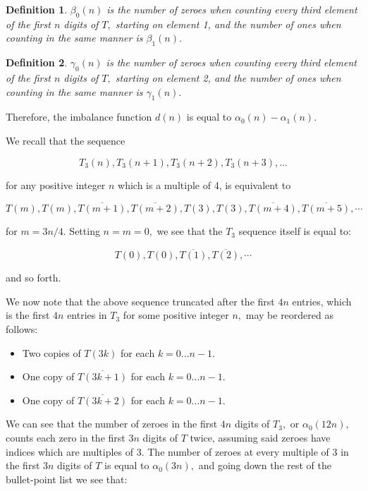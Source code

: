 \documentclass{article}
\newtheorem{definition}{Definition}[section]
\begin{document}
\begin{definition}
$\beta_0(n)$ is the number of zeroes when counting every third element of the first $n$ digits of $T,$ starting on element 1, and the number of ones when counting in the same manner is $\beta_1(n).$
\end{definition}

\begin{definition}
$\gamma_0(n)$ is the number of zeroes when counting every third element of the first $n$ digits of $T,$ starting on element 2, and the number of ones when counting in the same manner is $\gamma_1(n).$
\end{definition}

Therefore, the imbalance function $d(n)$ is equal to $\alpha_0(n) - \alpha_1(n).$

We recall that the sequence

$$T_3(n), T_3(n+1), T_3(n+2), T_3(n+3), ...$$

for any positive integer $n$ which is a multiple of 4, is equivalent to

$$T(m), T(m), \overline{T(m+1)}, \overline{T(m+2)}, T(3), T(3), \overline{T(m+4)}, \overline{T(m+5)}, \cdots$$

for $m = 3n/4.$ Setting $n = m = 0,$ we see that the $T_3$ sequence itself is equal to:

$$T(0), T(0), \overline{T(1)}, \overline{T(2)}, \cdots$$

and so forth.

We now note that the above sequence truncated after the first $4n$ entries, which is the first $4n$ entries in $T_3$ for some positive integer $n,$ may be reordered as follows:

\begin{itemize}
\label{reorder}
\item Two copies of $T(3k)$ for each $k = 0 ... n - 1.$
\item One copy of $\overline{T(3k+1)}$ for each $k = 0 ... n - 1.$
\item One copy of $\overline{T(3k+2)}$ for each $k = 0 ... n - 1.$
\end{itemize}

We can see that the number of zeroes in the first $4n$ digits of $T_3,$ or $\alpha_0(12n),$ counts each zero in the first $3n$ digits of $T$ twice, assuming said zeroes have indices which are multiples of 3. The number of zeroes at every multiple of 3 in the first $3n$ digits of $T$ is equal to $\alpha_0(3n),$ and going down the rest of the bullet-point list we see that:
\end{document}
